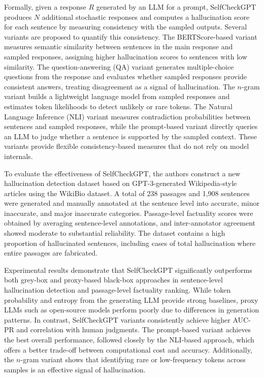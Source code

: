 Formally, given a response $R$ generated by an LLM for a prompt, SelfCheckGPT produces $N$ additional stochastic responses and computes a hallucination score for each sentence by measuring consistency with the sampled outputs. Several variants are proposed to quantify this consistency. The BERTScore-based variant measures semantic similarity between sentences in the main response and sampled responses, assigning higher hallucination scores to sentences with low similarity. The question-answering (QA) variant generates multiple-choice questions from the response and evaluates whether sampled responses provide consistent answers, treating disagreement as a signal of hallucination. The $n$-gram variant builds a lightweight language model from sampled responses and estimates token likelihoods to detect unlikely or rare tokens. The Natural Language Inference (NLI) variant measures contradiction probabilities between sentences and sampled responses, while the prompt-based variant directly queries an LLM to judge whether a sentence is supported by the sampled context. These variants provide flexible consistency-based measures that do not rely on model internals.

To evaluate the effectiveness of SelfCheckGPT, the authors construct a new hallucination detection dataset based on GPT-3-generated Wikipedia-style articles using the WikiBio dataset. A total of 238 passages and 1,908 sentences were generated and manually annotated at the sentence level into accurate, minor inaccurate, and major inaccurate categories. Passage-level factuality scores were obtained by averaging sentence-level annotations, and inter-annotator agreement showed moderate to substantial reliability. The dataset contains a high proportion of hallucinated sentences, including cases of total hallucination where entire passages are fabricated.

Experimental results demonstrate that SelfCheckGPT significantly outperforms both grey-box and proxy-based black-box approaches in sentence-level hallucination detection and passage-level factuality ranking. While token probability and entropy from the generating LLM provide strong baselines, proxy LLMs such as open-source models perform poorly due to differences in generation patterns. In contrast, SelfCheckGPT variants consistently achieve higher AUC-PR and correlation with human judgments. The prompt-based variant achieves the best overall performance, followed closely by the NLI-based approach, which offers a better trade-off between computational cost and accuracy. Additionally, the $n$-gram variant shows that identifying rare or low-frequency tokens across samples is an effective signal of hallucination.

